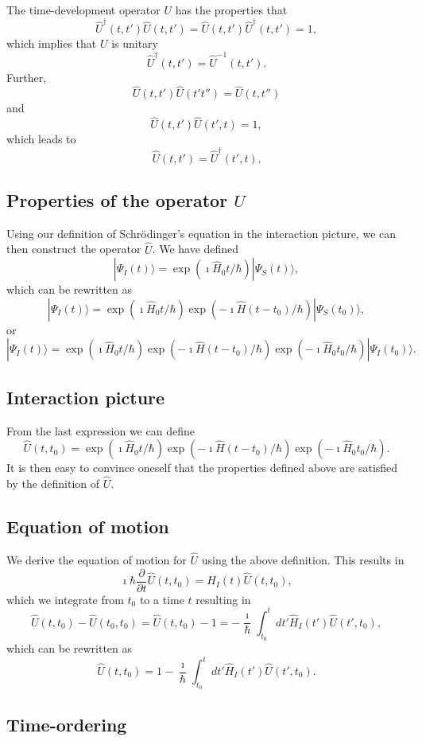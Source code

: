 \documentclass[%
oneside,                 %
final,                   %
10pt]{article}
\begin{document}
The time-development operator $U$ has the
properties that
\[
     \hat{U}^{\dagger}(t,t')\hat{U}(t,t')=\hat{U}(t,t')\hat{U}^{\dagger}(t,t')=1,
\]
which implies that $U$ is unitary
\[
     \hat{U}^{\dagger}(t,t')=\hat{U}^{-1}(t,t').
\]
Further,
\[
    \hat{U}(t,t')\hat{U}(t't'')=\hat{U}(t,t'')
\]
and
\[
    \hat{U}(t,t')\hat{U}(t',t)=1,
\]
which leads to
\[
    \hat{U}(t,t')=\hat{U}^{\dagger}(t',t).
\]

\subsection{Properties of the operator $U$}

Using our definition of Schrödinger's equation in the interaction picture, we can then construct the operator $\hat{U}$. We have defined
\[
|\Psi_I(t)\rangle = \exp{(\imath\hat{H}_0t/\hbar)}|\Psi_S(t)\rangle,
\]
which can be rewritten as 
\[
|\Psi_I(t)\rangle = \exp{(\imath\hat{H}_0t/\hbar)}\exp{(-\imath\hat{H}(t-t_0)/\hbar)}|\Psi_S(t_0)\rangle,
\]
or
\[
|\Psi_I(t)\rangle = \exp{(\imath\hat{H}_0t/\hbar)}\exp{(-\imath\hat{H}(t-t_0)/\hbar)}\exp{(-\imath\hat{H}_0t_0/\hbar)}|\Psi_I(t_0)\rangle.
\]

\subsection{Interaction picture}

From the last expression we can define
\[
\hat{U}(t,t_0)=\exp{(\imath\hat{H}_0t/\hbar)}\exp{(-\imath\hat{H}(t-t_0)/\hbar)}\exp{(-\imath\hat{H}_0t_0/\hbar)}.
\]
It is then easy to convince oneself that the properties defined above are satisfied by the definition of $\hat{U}$. 

\subsection{Equation of motion}

We derive the equation of motion for $\hat{U}$ using the above definition.
This results in
\[
\imath \hbar\frac{\partial }{\partial t}\hat{U}(t,t_0) = \hat{H}_I(t)\hat{U}(t,t_0),
\]
which we integrate from $t_0$ to a time $t$ resulting in
\[
\hat{U}(t,t_0)-\hat{U}(t_0,t_0)=\hat{U}(t,t_0)-1=-\frac{\imath}{\hbar}\int_{t_0}^t dt' \hat{H}_I(t')\hat{U}(t',t_0),
\]
which can be rewritten as
\[
\hat{U}(t,t_0)=1-\frac{\imath}{\hbar}\int_{t_0}^t dt' \hat{H}_I(t')\hat{U}(t',t_0).
\]

\subsection{Time-ordering}
\end{document}
